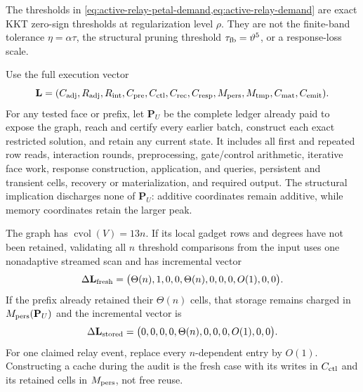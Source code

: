 \begin{remark}
\label{rem:active-relay-matched-sun-trace-ledger}
The thresholds in
\cref{eq:active-relay-petal-demand,eq:active-relay-demand} are exact KKT
zero-sign thresholds at regularization level $\rho$.  They are not the
finite-band tolerance $\eta=\alpha\tau$, the structural pruning threshold
$\tau_{\rm fb}=\vartheta^5$, or a response-loss scale.

Use the full execution vector
\begin{equation*}
 \mathbf L=
 (C_{\rm adj},R_{\rm adj},R_{\rm int},C_{\rm pre},C_{\rm ctl},
  C_{\rm rec},C_{\rm resp},M_{\rm pers},M_{\rm tmp},C_{\rm mat},C_{\rm emit}).
\end{equation*}
For any tested face or prefix, let $\mathbf P_U$ be the complete ledger already
paid to expose the graph, reach and certify every earlier batch, construct
each exact restricted solution, and retain any current state.  It includes
all first and repeated row reads, interaction rounds, preprocessing,
gate/control arithmetic, iterative face work, response construction,
application, and queries, persistent and transient cells, recovery or
materialization, and required output.  The structural implication discharges
none of $\mathbf P_U$: additive coordinates remain additive, while memory
coordinates retain the larger peak.

The graph has $\operatorname{cvol}(V)=13n$.  If its local gadget rows and
degrees have not been retained, validating all $n$ threshold comparisons from
the input uses one nonadaptive streamed scan and has incremental vector
\begin{equation}
 \Delta\mathbf L_{\rm fresh}
 =\bigl(\Theta(n),1,0,0,\Theta(n),0,0,0,O(1),0,0\bigr).
 \label{eq:active-relay-fresh-audit-vector}
\end{equation}
If the prefix already retained their $\Theta(n)$ cells, that storage remains
charged in $M_{\rm pers}(\mathbf P_U)$ and the incremental vector is
\begin{equation}
 \Delta\mathbf L_{\rm stored}
 =\bigl(0,0,0,0,\Theta(n),0,0,0,O(1),0,0\bigr).
 \label{eq:active-relay-stored-audit-vector}
\end{equation}
For one claimed relay event, replace every $n$-dependent entry by $O(1)$.
Constructing a cache during the audit is the fresh case with its writes in
$C_{\rm ctl}$ and its retained cells in $M_{\rm pers}$, not free reuse.


\end{remark}
